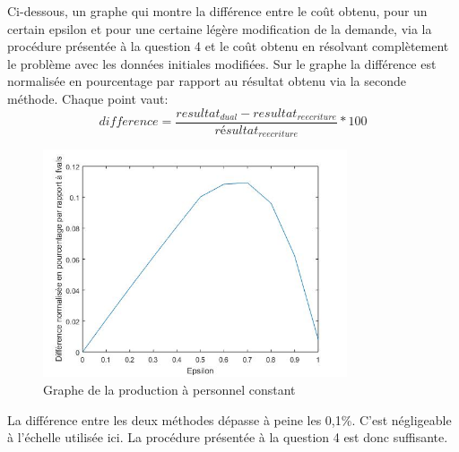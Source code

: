 Ci-dessous, un graphe qui montre la différence entre le coût obtenu, pour un certain epsilon et pour une certaine légère modification de la demande, via la procédure présentée à la question 4 et le coût obtenu en résolvant complètement le problème avec les données initiales modifiées. Sur le graphe la différence est normalisée en pourcentage par rapport au résultat obtenu via la seconde méthode. Chaque point vaut:
\begin{equation*}
difference = \frac{resultat_{dual} - resultat_{reecriture}}{résultat_{reecriture}} * 100 
\end{equation*}
 
\begin{figure}[h]
    \centering
    \includegraphics[width=0.8\textwidth]{graphes/graphq5.jpg}
    \caption{Graphe de la production à personnel constant}
    \label{fig:q5}
\end{figure}

La différence entre les deux méthodes dépasse à peine les 0,1\%. C'est négligeable à l'échelle utilisée ici. La procédure présentée à la question 4 est donc suffisante.